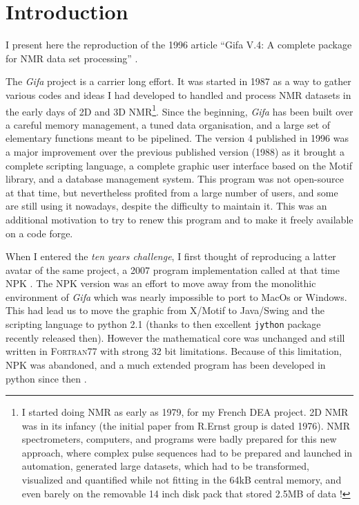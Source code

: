 \hypertarget{introduction}{%
\section{Introduction}\label{introduction}}

I present here the reproduction of the 1996 article ``Gifa V.4: A
complete package for NMR data set processing'' \cite{Pons_1996}.

The \emph{Gifa} project is a carrier long effort. It was started in 1987
as a way to gather various codes and ideas I had developed to handled
and process NMR datasets in the early days of 2D and 3D NMR\footnote{I
  started doing NMR as early as 1979, for my French DEA project. 2D NMR
  was in its infancy (the initial paper from R.Ernst group is dated
  1976). NMR spectrometers, computers, and programs were badly prepared
  for this new approach, where complex pulse sequences had to be
  prepared and launched in automation, generated large datasets, which
  had to be transformed, visualized and quantified while not fitting in
  the 64kB central memory, and even barely on the removable 14 inch disk
  pack that stored 2.5MB of data !}. Since the beginning, \emph{Gifa}
has been built over a careful memory management, a tuned data
organisation, and a large set of elementary functions meant to be
pipelined. The version 4 published in 1996 was a major improvement over
the previous published version (1988) as it brought a complete scripting
language, a complete graphic user interface based on the Motif library,
and a database management system. This program was not open-source at
that time, but nevertheless profited from a large number of users, and
some are still using it nowadays, despite the difficulty to maintain it.
This was an additional motivation to try to renew this program and to
make it freely available on a code forge.

When I entered the \emph{ten years challenge}, I first thought of
reproducing a latter avatar of the same project, a 2007 program
implementation called at that time NPK \cite{Tramesel_2007}. The NPK
version was an effort to move away from the monolithic environment of
\emph{Gifa} which was nearly impossible to port to MacOs or Windows.
This had lead us to move the graphic from X/Motif to Java/Swing and the
scripting language to python 2.1 (thanks to then excellent
\texttt{jython} package recently released then). However the
mathematical core was unchanged and still written in F\textsc{ortran}77
with strong 32 bit limitations. Because of this limitation, NPK was
abandoned, and a much extended program has been developed in python
since then \cite{Spike2016}.

